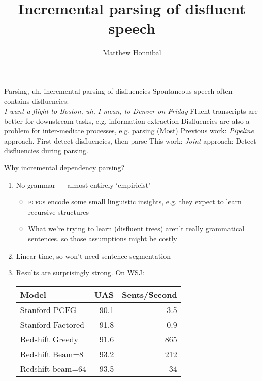\documentclass{lecture}
\title{Incremental parsing of disfluent speech}
\author{Matthew Honnibal}
\begin{document}
\titleslide

\begin{points}{Parsing, uh, incremental parsing of disfluencies}
\p Spontaneous speech often contains disﬂuencies:\\
\emph{I want a ﬂight to Boston, uh, I mean, to Denver on Friday}
\p Fluent transcripts are better for downstream tasks, e.g. information extraction
\p Disfluencies are also a problem for inter-mediate processes, e.g. parsing
\p (Most) Previous work: \emph{Pipeline} approach. First detect disfluencies, then parse
\p This work: \emph{Joint} approach: Detect disfluencies during parsing.
\end{points}

\begin{plain}{Why incremental dependency parsing?}
    \begin{enumerate}
        \item No grammar --- almost entirely `empiricist'\\
            \begin{itemize}
                \item \textsc{pcfg}s encode some small linguistic insights, e.g.
                      they expect to learn recursive structures
                  \item What we're trying to learn (disfluent trees) aren't
                        really grammatical sentences,
                      so those assumptions might be costly
            \end{itemize}
        \item Linear time, so won't need sentence segmentation
        \item Results are surprisingly strong. On WSJ:\\
            \begin{table}
            \begin{tabular}{l|rr}
                \hline
                Model         & UAS   & Sents/Second \\
                \hline \hline
                Stanford PCFG & 90.1 & 3.5 \\
                Stanford Factored & 91.8 & 0.9 \\
                Redshift Greedy & 91.6 & 865 \\
                Redshift Beam=8 & 93.2  & 212 \\
                Redshift beam=64 & 93.5 & 34 \\
                \hline
            \end{tabular}
        \end{table}
    \end{enumerate}
\end{plain}
\end{document}
